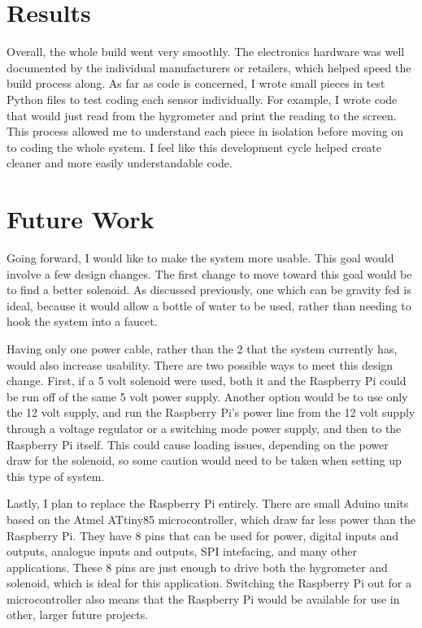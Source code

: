 \documentclass[11pt] {article}
\begin{document}

\section{Results}
Overall, the whole build went very smoothly. The electronics hardware was well documented by the individual
manufacturers or retailers, which helped speed the build process along. As far as code is concerned, I wrote small
pieces in test Python files to test coding each sensor individually. For example, I wrote code that would just read
from the hygrometer and print the reading to the screen. This process allowed me to understand each piece in isolation
before moving on to coding the whole system. I feel like this development cycle helped create cleaner and more easily
understandable code.

\section{Future Work}
Going forward, I would like to make the system more usable. This goal would involve a few design changes. The first
change to move toward this goal would be to find a better solenoid. As discussed previously, one which can be gravity
fed is ideal, because it would allow a bottle of water to be used, rather than needing to hook the system into a
faucet.

Having only one power cable, rather than the 2 that the system currently has, would also increase usability. There are
two possible ways to meet this design change. First, if a 5 volt solenoid were used, both it and the Raspberry Pi could
be run off of the same 5 volt power supply. Another option would be to use only the 12 volt supply, and run the
Raspberry Pi's power line from the 12 volt supply through a voltage regulator or a switching mode power supply,
and then to the Raspberry Pi itself. This could cause loading issues, depending on the power draw for the solenoid, so
some caution would need to be taken when setting up this type of system.

Lastly, I plan to replace the Raspberry Pi entirely. There are small Aduino units based on the Atmel ATtiny85
microcontroller, which draw far less power than the Raspberry Pi. They have 8 pins that can be used for power, digital
inputs and outputs, analogue inputs and outputs, SPI intefacing, and many other applications. These 8 pins are just
enough to drive both the hygrometer and solenoid, which is ideal for this application. Switching the Raspberry Pi out
for a microcontroller also means that the Raspberry Pi would be available for use in other, larger future projects.

\end{document}
